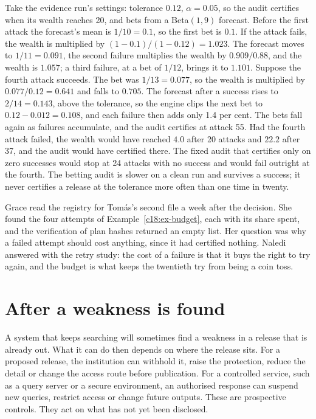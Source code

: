 \begin{example}\label{c18:ex-bet}
Take the evidence run's settings: tolerance
$0.12$, $\alpha=0.05$, so the audit certifies when its wealth reaches 20, and bets from a Beta$(1,9)$
forecast. Before the first attack the forecast's mean is $1/10=0.1$, so the first bet is $0.1$. If the
attack fails, the wealth is multiplied by $(1-0.1)/(1-0.12)=1.023$. The forecast moves to
$1/11=0.091$, the second failure multiplies the wealth by $0.909/0.88$, and the wealth is $1.057$;
a third failure, at a bet of $1/12$, brings it to $1.101$. Suppose the fourth attack succeeds. The
bet was $1/13=0.077$, so the wealth is multiplied by $0.077/0.12=0.641$ and falls to $0.705$.
The forecast after a success rises to $2/14=0.143$, above the tolerance, so the engine clips the
next bet to $0.12-0.012=0.108$, and each failure then adds only 1.4 per cent. The bets fall
again as failures accumulate, and the audit certifies at attack 55. Had the fourth attack failed,
the wealth would have reached $4.0$ after 20 attacks and $22.2$ after 37, and the audit would
have certified there. The fixed audit that certifies only on zero successes would stop at 24
attacks with no success and would fail outright at the fourth. The betting audit is slower
on a clean run and survives a success; it never certifies a release at the tolerance more often
than one time in twenty.
\end{example}

Grace read the registry for Tom\'as's second file a week after the decision. She found the
four attempts of Example~\ref{c18:ex-budget}, each with its share spent, and the verification of plan hashes
returned an empty list. Her question was why a failed attempt should cost anything, since
it had certified nothing. Naledi answered with the retry study: the cost of a failure is that it
buys the right to try again, and the budget is what keeps the twentieth try from being a coin
toss.

\section{After a weakness is found}\label{c18:sec-found}

A system that keeps searching will sometimes find a weakness in a release that is already
out. What it can do then depends on where the release sits. For a proposed release, the
institution can withhold it, raise the protection, reduce the detail or change the access route
before publication. For a controlled service, such as a query server or a secure environment,
an authorised response can suspend new queries, restrict access or change future outputs.
These are prospective controls. They act on what has not yet been disclosed.

